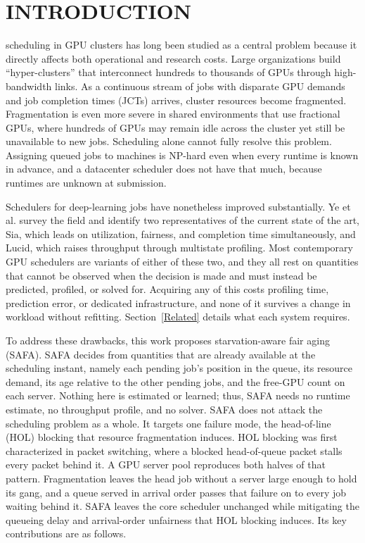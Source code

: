 \documentclass{ieeetj}
\begin{document}
\maketitle


\section{INTRODUCTION}\label{sec1}
 scheduling in GPU clusters has long been studied as a central problem because it directly affects both operational and research costs. Large organizations build ``hyper-clusters'' that interconnect hundreds to thousands of GPUs through high-bandwidth links. As a continuous stream of jobs with disparate GPU demands and job completion times (JCTs) arrives, cluster resources become fragmented\cite{athlur2022varuna}. Fragmentation is even more severe in shared environments that use fractional GPUs, where hundreds of GPUs may remain idle across the cluster yet still be unavailable to new jobs\cite{weng2023beware}. Scheduling alone cannot fully resolve this problem. Assigning queued jobs to machines is NP-hard even when every runtime is known in advance\cite{ullman1975np,b1}, and a datacenter scheduler does not have that much, because runtimes are unknown at submission\cite{b2}.

Schedulers for deep-learning jobs have nonetheless improved substantially. Ye et al.\cite{b3} survey the field and identify two representatives of the current state of the art, Sia\cite{b4}, which leads on utilization, fairness, and completion time simultaneously, and Lucid\cite{b5}, which raises throughput through multistate profiling. Most contemporary GPU schedulers are variants of either of these two, and they all rest on quantities that cannot be observed when the decision is made and must instead be predicted, profiled, or solved for. Acquiring any of this costs profiling time, prediction error, or dedicated infrastructure, and none of it survives a change in workload without refitting. Section~\ref{Related} details what each system requires.

To address these drawbacks, this work proposes starvation-aware fair aging (SAFA). SAFA decides from quantities that are already available at the scheduling instant, namely each pending job's position in the queue, its resource demand, its age relative to the other pending jobs, and the free-GPU count on each server. Nothing here is estimated or learned; thus, SAFA needs no runtime estimate, no throughput profile, and no solver. SAFA does not attack the scheduling problem as a whole. It targets one failure mode, the head-of-line (HOL) blocking\cite{karol1987hol} that resource fragmentation induces. HOL blocking was first characterized in packet switching, where a blocked head-of-queue packet stalls every packet behind it. A GPU server pool reproduces both halves of that pattern. Fragmentation leaves the head job without a server large enough to hold its gang, and a queue served in arrival order passes that failure on to every job waiting behind it. SAFA leaves the core scheduler unchanged while mitigating the queueing delay and arrival-order unfairness that HOL blocking induces. Its key contributions are as follows.
\end{document}
